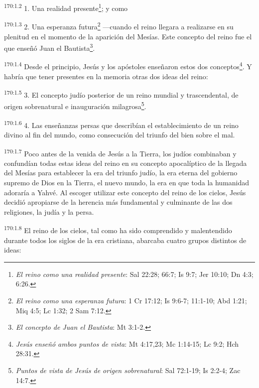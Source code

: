 \par
\textsuperscript{170:1.2} 1. Una realidad presente\footnote{\textit{El reino como una realidad presente}: Sal 22:28; 66:7; Is 9:7; Jer 10:10; Dn 4:3; 6:26.}; y como

\par
\textsuperscript{170:1.3} 2. Una esperanza futura\footnote{\textit{El reino como una esperanza futura}: 1 Cr 17:12; Is 9:6-7; 11:1-10; Abd 1:21; Miq 4:5; Lc 1:32; 2 Sam 7:12.} ---cuando el reino llegara a realizarse en su plenitud en el momento de la aparición del Mesías. Este concepto del reino fue el que enseñó Juan el Bautista\footnote{\textit{El concepto de Juan el Bautista}: Mt 3:1-2.}.

\par
\textsuperscript{170:1.4} Desde el principio, Jesús y los apóstoles enseñaron estos dos conceptos\footnote{\textit{Jesús enseñó ambos puntos de vista}: Mt 4:17,23; Mc 1:14-15; Lc 9:2; Hch 28:31.}. Y habría que tener presentes en la memoria otras dos ideas del reino:

\par
\textsuperscript{170:1.5} 3. El concepto judío posterior de un reino mundial y trascendental, de origen sobrenatural e inauguración milagrosa\footnote{\textit{Puntos de vista de Jesús de origen sobrenatural}: Sal 72:1-19; Is 2:2-4; Zac 14:7.}.

\par
\textsuperscript{170:1.6} 4. Las enseñanzas persas que describían el establecimiento de un reino divino al fin del mundo, como consecución del triunfo del bien sobre el mal.

\par
\textsuperscript{170:1.7} Poco antes de la venida de Jesús a la Tierra, los judíos combinaban y confundían todas estas ideas del reino en su concepto apocalíptico de la llegada del Mesías para establecer la era del triunfo judío, la era eterna del gobierno supremo de Dios en la Tierra, el nuevo mundo, la era en que toda la humanidad adoraría a Yahvé. Al escoger utilizar este concepto del reino de los cielos, Jesús decidió apropiarse de la herencia más fundamental y culminante de las dos religiones, la judía y la persa.

\par
\textsuperscript{170:1.8} El reino de los cielos, tal como ha sido comprendido y malentendido durante todos los siglos de la era cristiana, abarcaba cuatro grupos distintos de ideas:

